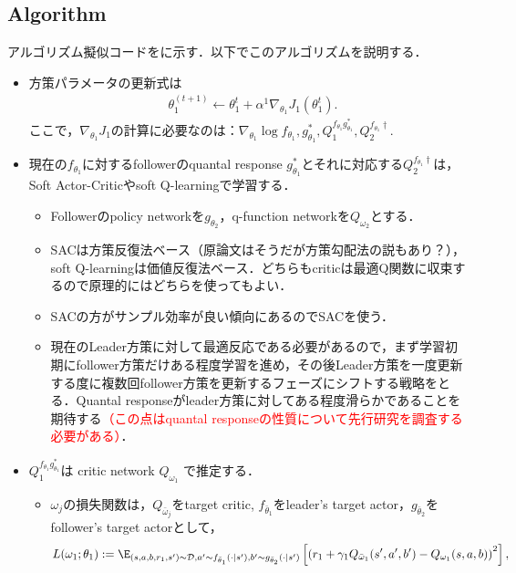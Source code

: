 \documentclass[a4paper,10pt,dvipdfmx]{jsarticle}
\begin{document}
\subsection{Algorithm}\label{sec:SSPG_qr_algo}

アルゴリズム擬似コードをに示す．以下でこのアルゴリズムを説明する．

\begin{itemize}
    \item 方策パラメータの更新式は
    \begin{align}
        &\theta_1^{(t+1)}\gets \theta_1^t+\alpha^1\nabla_{\theta_1} J_1(\theta_1^t).
    \end{align}
    ここで，$\nabla_{\theta_1}J_1$の計算に必要なのは：$\nabla_{\theta_1}\log f_{\theta_1}, g_{\theta_1}^*, Q_1^{f_{\theta_1}g_{\theta_1}^*}, Q_2^{f_{\theta_1}\dag}$.
    \item 現在の$f_{\theta_1}$に対するfollowerのquantal response $g_{\theta_1}^*$とそれに対応する$Q_2^{f_{\theta_1}\dag}$は，Soft Actor-Criticやsoft Q-learningで学習する．
    \begin{itemize}
        \item Followerのpolicy networkを$g_{\theta_2}$，q-function networkを$Q_{\omega_2}$とする．
        \item SACは方策反復法ベース（原論文はそうだが方策勾配法の説もあり？），soft Q-learningは価値反復法ベース．どちらもcriticは最適Q関数に収束するので原理的にはどちらを使ってもよい．
        \item SACの方がサンプル効率が良い傾向にあるのでSACを使う．
        \item 現在のLeader方策に対して最適反応である必要があるので，まず学習初期にfollower方策だけある程度学習を進め，その後Leader方策を一度更新する度に複数回follower方策を更新するフェーズにシフトする戦略をとる．Quantal responseがleader方策に対してある程度滑らかであることを期待する\textcolor{red}{（この点はquantal responseの性質について先行研究を調査する必要がある）}．
    \end{itemize}
    \item $Q_1^{f_{\theta_1}g_{\theta_1}^*}$は
    critic network $Q_{\omega_1}$ で推定する．
    \begin{itemize}
        \item $\omega_j$の損失関数は，$Q_{\bar{\omega}_j}$をtarget critic, $f_{\bar{\theta}_1}$をleader's target actor，$g_{\bar{\theta}_2}$をfollower's target actorとして，
        \begin{align}
            &L(\omega_1;\theta_1):=\E_{(s,a,b,r_1,s')\sim\mathcal{D},a'\sim f_{\bar{\theta}_1}(\cdot|s'),b'\sim g_{\bar{\theta}_2}(\cdot|s')}\left[\left(r_1+\gamma_1Q_{\bar{\omega}_1}(s',a',b') - Q_{\omega_1}(s,a,b)\right)^2\right],\\

\end{align}
\end{itemize}
\end{itemize}
\end{document}

